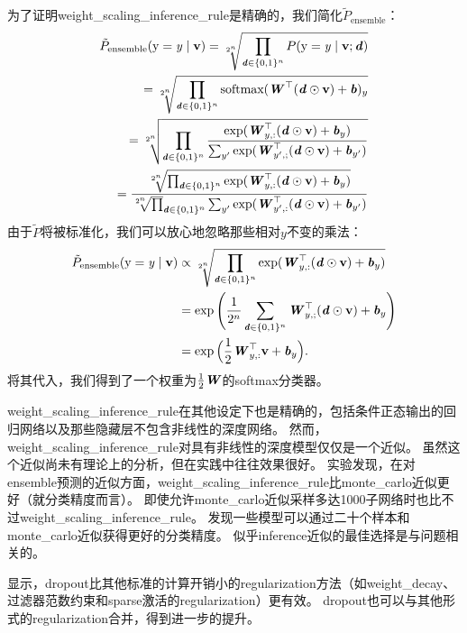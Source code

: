 为了证明\gls{weight_scaling_inference_rule}是精确的，我们简化$ \tilde{P}_{\text{ensemble}}$：
\begin{align}
\tilde{P}_{\text{ensemble}}(\mathrm{y}=\mathit{y} \mid \mathbf{v}) =
\sqrt[2^n]{\prod_{\boldsymbol{\mathit{d}} \in \{0,1\}^n} P(\mathrm{y} = \mathit{y} \mid \mathbf{v}; \boldsymbol{\mathit{d}})} \\
= \sqrt[2^n]{\prod_{\boldsymbol{\mathit{d}} \in \{0,1\}^n} \text{softmax}(\boldsymbol{\mathit{W}}^\top(\boldsymbol{\mathit{d}} \odot \mathbf{v}) + \boldsymbol{\mathit{b}})_y} \\
= \sqrt[2^n]{\prod_{\boldsymbol{\mathit{d}} \in \{0,1\}^n} \frac{\exp (\boldsymbol{\mathit{W}}_{y,:}^\top(\boldsymbol{\mathit{d}} \odot \mathbf{v}) + \boldsymbol{\mathit{b}}_y)}
{\sum_{y'}\exp (\boldsymbol{\mathit{W}}_{y',;}^\top(\boldsymbol{\mathit{d}} \odot \mathbf{v}) + \boldsymbol{\mathit{b}}_{y'})}}\\
=  \frac{\sqrt[2^n]{\prod_{\boldsymbol{\mathit{d}} \in \{0,1\}^n}\exp (\boldsymbol{\mathit{W}}_{y,:}^\top(\boldsymbol{\mathit{d}} \odot \mathbf{v}) + \boldsymbol{\mathit{b}}_y)}}
{ \sqrt[2^n] \prod_{\boldsymbol{\mathit{d}} \in \{0,1\}^n} \sum_{y'}\exp (\boldsymbol{\mathit{W}}_{y',:}^\top(\boldsymbol{\mathit{d}} \odot \mathbf{v}) + \boldsymbol{\mathit{b}}_{y'})}
\end{align}
由于$\tilde P$将被标准化，我们可以放心地忽略那些相对$y$不变的乘法：
\begin{align}
\tilde{P}_{\text{ensemble}}(\mathrm{y}=\mathit{y} \mid \mathbf{v}) &\propto 
\sqrt[2^n]{\prod_{\boldsymbol{\mathit{d}} \in \{0,1\}^n} \exp (\boldsymbol{\mathit{W}}_{y,:}^\top(\boldsymbol{\mathit{d}} \odot \mathbf{v}) + \boldsymbol{\mathit{b}}_y)} \\
& = \exp \Bigg(\frac{1}{2^n} \sum_{\boldsymbol{\mathit{d}} \in \{0,1\}^n} \boldsymbol{\mathit{W}}_{y,;}^\top(\boldsymbol{\mathit{d}} \odot \mathbf{v}) + \boldsymbol{\mathit{b}}_y \Bigg) \\
& = \exp \Big(\frac{1}{2}\boldsymbol{\mathit{W}}_{y,:}^\top \mathbf{v} + \boldsymbol{\mathit{b}}_y \Big) .
\end{align}
将其代入，我们得到了一个权重为$\frac{1}{2}\boldsymbol{\mathit{W}}$的\gls{softmax}分类器。


\gls{weight_scaling_inference_rule}在其他设定下也是精确的，包括条件正态输出的回归网络以及那些隐藏层不包含非线性的深度网络。
然而，\gls{weight_scaling_inference_rule}对具有非线性的深度模型仅仅是一个近似。
虽然这个近似尚未有理论上的分析，但在实践中往往效果很好。
\cite{Goodfellow-et-al-ICML2013}实验发现，在对\gls{ensemble}预测的近似方面，\gls{weight_scaling_inference_rule}比\gls{monte_carlo}近似更好（就分类精度而言）。
即使允许\gls{monte_carlo}近似采样多达1000子网络时也比不过\gls{weight_scaling_inference_rule}。
\cite{gal2015bayesian}发现一些模型可以通过二十个样本和\gls{monte_carlo}近似获得更好的分类精度。
似乎\gls{inference}近似的最佳选择是与问题相关的。

\cite{Srivastava14}显示，\gls{dropout}比其他标准的计算开销小的\gls{regularization}方法（如\gls{weight_decay}、过滤器范数约束和\gls{sparse}激活的\gls{regularization}）更有效。
\gls{dropout}也可以与其他形式的\gls{regularization}合并，得到进一步的提升。

